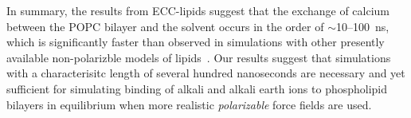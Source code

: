 In summary, the results from ECC-lipids suggest 
that the exchange of calcium between the POPC bilayer and the solvent 
occurs in the order of $\sim$10--100~ns, 
which is significantly faster than observed in simulations 
with other presently available non-polarizble models of lipids~\citep{javanainen17, catte16}. 
Our results suggest that simulations with a characterisitc length of several hundred nanoseconds 
are necessary and yet sufficient for 
simulating binding of alkali and alkali earth ions to phospholipid bilayers 
in equilibrium when more realistic \emph{polarizable} force fields are used. 
 


